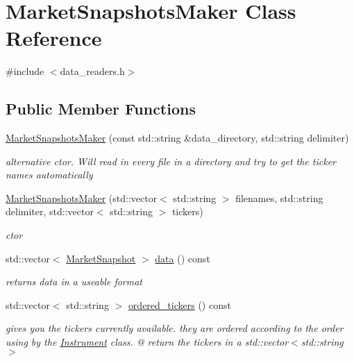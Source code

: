 \hypertarget{classMarketSnapshotsMaker}{}\section{Market\+Snapshots\+Maker Class Reference}
\label{classMarketSnapshotsMaker}


{\ttfamily \#include $<$data\+\_\+readers.\+h$>$}

\subsection*{Public Member Functions}
\begin{DoxyCompactItemize}
\item 
\hyperlink{classMarketSnapshotsMaker_a54050922d3dd9f554a5d3e4137e1963c}{Market\+Snapshots\+Maker} (const std\+::string \&data\+\_\+directory, std\+::string delimiter)
\begin{DoxyCompactList}\small\item\em alternative ctor. Will read in every file in a directory and try to get the ticker names automatically \end{DoxyCompactList}\item 
\hyperlink{classMarketSnapshotsMaker_a8107a3b92c32118a667b5e86099ecde8}{Market\+Snapshots\+Maker} (std\+::vector$<$ std\+::string $>$ filenames, std\+::string delimiter, std\+::vector$<$ std\+::string $>$ tickers)
\begin{DoxyCompactList}\small\item\em ctor \end{DoxyCompactList}\item 
std\+::vector$<$ \hyperlink{classMarketSnapshot}{Market\+Snapshot} $>$ \hyperlink{classMarketSnapshotsMaker_a1fbc9bc9f9e8c6bb1641211b027f7b0d}{data} () const
\begin{DoxyCompactList}\small\item\em returns data in a useable format \end{DoxyCompactList}\item 
std\+::vector$<$ std\+::string $>$ \hyperlink{classMarketSnapshotsMaker_a029dc542bbf03a3e1b1af72d5b72efd1}{ordered\+\_\+tickers} () const
\begin{DoxyCompactList}\small\item\em gives you the tickers currently available. they are ordered according to the order using by the \hyperlink{classInstrument}{Instrument} class. @ return the tickers in a std\+::vector$<$std\+::string$>$ \end{DoxyCompactList}\end{DoxyCompactItemize}


